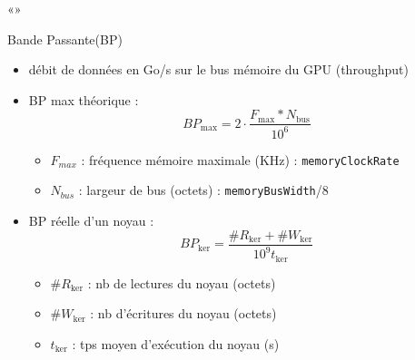 \documentclass[11pt,mathserif]{beamer}
\begin{document}
«»
\begin{frame}{Bande Passante(BP)}
  \begin{itemize}[<+->]
    \item débit de données en Go/s sur le bus mémoire du GPU (throughput)
    \item BP max théorique : $$BP_{\mbox{max}} = 2 \cdot \frac{F_{\mbox{max}} * N_{\mbox{bus}}}{10^6} $$
      \begin{itemize}
        \item $F_{max}$ : fréquence mémoire maximale (KHz) : \texttt{memoryClockRate}
        \item $N_{bus}$ : largeur de bus (octets) : \texttt{memoryBusWidth}/8
      \end{itemize}
    \item BP réelle d'un noyau : $$ BP_{\mbox{ker}} = \frac{\# R_{\ker} + \# W_{\ker}}{10^9 t_{\ker}} $$
      \begin{itemize}
        \item $\# R_{\ker}$ : nb de lectures du noyau (octets)
        \item $\# W_{\ker}$ : nb d'écritures du noyau (octets)
        \item $t_{\ker}$ : tps moyen d'exécution du noyau (s)
      \end{itemize}
  \end{itemize}
\end{frame}
\end{document}
